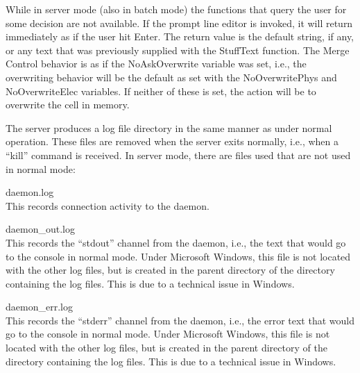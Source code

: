 While in server mode (also in batch mode) the {\Xic} functions that
query the user for some decision are not available.  If the prompt
line editor is invoked, it will return immediately as if the user hit
{\kb Enter}.  The return value is the default string, if any, or any
text that was previously supplied with the {\vt StuffText} function. 
The {\cb Merge Control} behavior is as if the {\et NoAskOverwrite}
variable was set, i.e., the overwriting behavior will be the default
as set with the {\et NoOverwritePhys} and {\et NoOverwriteElec}
variables.  If neither of these is set, the action will be to
overwrite the cell in memory.

The server produces a log file directory in the same manner as under
normal {\Xic} operation.  These files are removed when the server
exits normally, i.e., when a ``{\vt kill}'' command is received.  In
server mode, there are files used that are not used in normal mode:

\begin{description}
\item{\vt daemon.log}\\
  This records connection activity to the daemon.
\item{\vt daemon\_out.log}\\
  This records the ``stdout'' channel from the daemon, i.e., the text
  that would go to the console in normal mode.  Under Microsoft
  Windows, this file is not located with the other log files, but is
  created in the parent directory of the directory containing the log
  files.  This is due to a technical issue in Windows.
\item{\vt daemon\_err.log}\\
  This records the ``stderr'' channel from the daemon, i.e., the error
  text that would go to the console in normal mode.  Under Microsoft
  Windows, this file is not located with the other log files, but is
  created in the parent directory of the directory containing the log
  files.  This is due to a technical issue in Windows.
\end{description}

